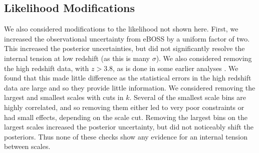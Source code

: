 



\subsection{Likelihood Modifications}
\label{sec:altlikelihood}

We also considered modifications to the likelihood not shown here. First, we increased the observational uncertainty from eBOSS by a uniform factor of two. This increased the posterior uncertainties, but did not significantly resolve the internal tension at low redshift (as this is many $\sigma$). We also considered removing the high redshift data, with $z > 3.8$, as is done in some earlier analyses \cite{2011MNRAS.413.1717B}. We found that this made little difference as the statistical errors in the high redshift data are large and so they provide little information. 
We considered removing the largest and smallest scales with cuts in $k$. Several of the smallest scale bins are highly correlated, and so removing them either led to very poor constraints or had small effects, depending on the scale cut. Removing the largest bins on the largest scales increased the posterior uncertainty, but did not noticeably shift the posteriors. Thus none of these checks show any evidence for an internal tension between scales.

